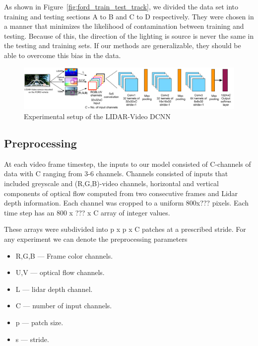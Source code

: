 \documentclass{article}
\begin{document}
As shown in Figure~\ref{fig:ford_train_test_track}, we divided the data set into training and testing sections A to B and C to D respectively. They were chosen in a manner that minimizes the likelihood of contamination between training and testing. Because of this, the direction of the lighting is source is never the same in the testing and training sets. If our methods are generalizable, they should be able to overcome this bias in the data.   

\begin{figure}[htbp]
    \centering
        \includegraphics[scale=0.35]{Figures/lidar_dcnn_setup1.pdf}
    \caption{Experimental setup of the LIDAR-Video DCNN}
    \label{fig:Figures_lidar_dcnn_setup1}
\end{figure}


\subsection{Preprocessing} %
\label{sub:preprocessing}
At each video frame timestep, the inputs to our model consisted of C-channels of data with C ranging from 3-6 channels. Channels consisted of inputs that included greyscale and (R,G,B)-video channels, horizontal and vertical components of optical flow computed from two consecutive frames and Lidar depth information. Each channel was cropped to a uniform 800x??? pixels. Each time step has an 800 x ??? x C array of integer values.

These arrays were subdivided into p x p x C patches at a prescribed stride. For any experiment we can denote the preprocessing parameters 
\begin{itemize}
\item R,G,B --- Frame color channels.
\item U,V --- optical flow channels.
\item L --- lidar depth channel.
\item C --- number of input channels.
\item p --- patch size.
\item s --- stride.
\end{itemize}  
\end{document}
